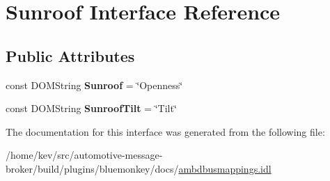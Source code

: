 \hypertarget{interfaceSunroof}{\section{Sunroof Interface Reference}
\label{interfaceSunroof}
}
\subsection*{Public Attributes}
\begin{DoxyCompactItemize}
\item 
\hypertarget{interfaceSunroof_af525e7e42bef949cdb38689a44872ebf}{const D\+O\+M\+String {\bfseries Sunroof} = \char`\"{}Openness\char`\"{}}\label{interfaceSunroof_af525e7e42bef949cdb38689a44872ebf}

\item 
\hypertarget{interfaceSunroof_afe5bef43d2e75c081c1ccf4df291357a}{const D\+O\+M\+String {\bfseries Sunroof\+Tilt} = \char`\"{}Tilt\char`\"{}}\label{interfaceSunroof_afe5bef43d2e75c081c1ccf4df291357a}

\end{DoxyCompactItemize}


The documentation for this interface was generated from the following file\+:\begin{DoxyCompactItemize}
\item 
/home/kev/src/automotive-\/message-\/broker/build/plugins/bluemonkey/docs/\hyperlink{ambdbusmappings_8idl}{ambdbusmappings.\+idl}\end{DoxyCompactItemize}
